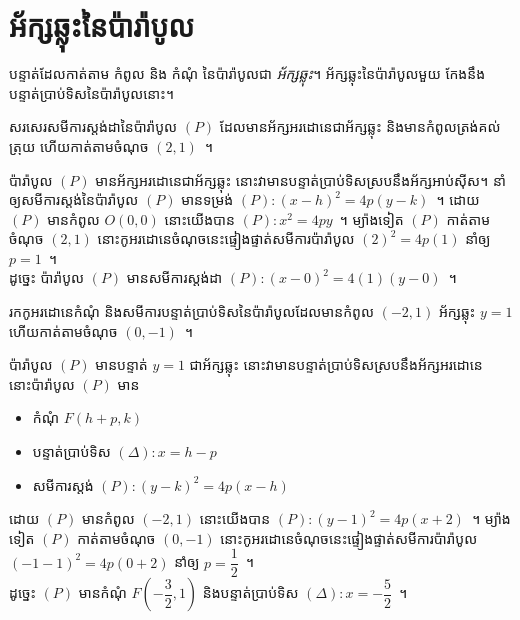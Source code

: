 \section{អ័ក្សឆ្លុះនៃប៉ារ៉ាបូល}
\begin{proposition*}
	បន្ទាត់ដែលកាត់តាម កំពូល និង កំណុំ នៃប៉ារ៉ាបូលជា \emph{អ័ក្សឆ្លុះ}។ អ័ក្សឆ្លុះនៃប៉ារ៉ាបូលមួយ កែងនឹងបន្ទាត់ប្រាប់ទិសនៃប៉ារ៉ាបូលនោះ។
\end{proposition*}
%
\begin{example*}
	សរសេរសមីការស្តង់ដានៃប៉ារ៉ាបូល $ (P) $ ដែលមានអ័ក្សអរដោនេជាអ័ក្សឆ្លុះ និងមានកំពូលត្រង់គល់ត្រុយ ហើយកាត់តាមចំណុច $ (2,1) $~។
\end{example*}
%
\begin{answer}
	ប៉ារ៉ាបូល $ (P) $ មានអ័ក្សអរដោនេជាអ័ក្សឆ្លុះ នោះវាមានបន្ទាត់ប្រាប់ទិសស្របនឹងអ័ក្សអាប់ស៊ីស។ នាំឲ្យសមីការស្តង់នៃប៉ារ៉ាបូល $ (P) $ មានទម្រង់ $ (P):(x-h)^2=4p(y-k) $~។ ដោយ $ (P) $ មានកំពូល $ O(0,0) $ នោះយើងបាន $ (P):x^2=4py $~។ ម្យ៉ាងទៀត $ (P) $ កាត់តាមចំណុច $ (2,1) $ នោះកូអរដោនេចំណុចនេះផ្ទៀងផ្ទាត់សមីការប៉ារ៉ាបូល $ (2)^2=4p(1) $ នាំឲ្យ $ p=1 $~។\\
	ដូច្នេះ ប៉ារ៉ាបូល $ (P) $ មានសមីការស្តង់ដា $ (P):(x-0)^2=4(1)(y-0) $~។
\end{answer}
%
\begin{example*}
	រកកូអរដោនេកំណុំ និងសមីការបន្ទាត់ប្រាប់ទិសនៃប៉ារ៉ាបូលដែលមានកំពូល $ (-2,1) $ អ័ក្សឆ្លុះ $ y=1 $ ហើយកាត់តាមចំណុច $ (0,-1) $~។
\end{example*}
%
\begin{answer}
	ប៉ារ៉ាបូល $ (P) $ មានបន្ទាត់ $ y=1 $ ជាអ័ក្សឆ្លុះ នោះវាមានបន្ទាត់ប្រាប់ទិសស្របនឹងអ័ក្សអរដោនេនោះប៉ារ៉ាបូល $ (P) $ មាន
	\begin{itemize}
		\item កំណុំ $ F(h+p,k) $
		\item បន្ទាត់ប្រាប់ទិស $ (\Delta):x=h-p $
		\item សមីការស្តង់ $ (P):(y-k)^2=4p(x-h) $
	\end{itemize}
	ដោយ $ (P) $ មានកំពូល $ (-2,1) $ នោះយើងបាន $ (P):(y-1)^2=4p(x+2) $~។ ម្យ៉ាងទៀត $ (P) $ កាត់តាមចំណុច $ (0,-1) $ នោះកូអរដោនេចំណុចនេះផ្ទៀងផ្ទាត់សមីការប៉ារ៉ាបូល $ (-1-1)^2=4p(0+2) $ នាំឲ្យ $ p=\dfrac{1}{2} $~។\\
	ដូច្នេះ $ (P) $ មានកំណុំ $ F\left(-\dfrac{3}{2},1\right) $ និងបន្ទាត់ប្រាប់ទិស $ (\Delta):x=-\dfrac{5}{2} $~។
\end{answer}
%
